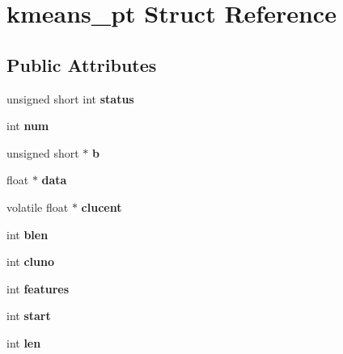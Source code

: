 \hypertarget{structkmeans__pt}{}\section{kmeans\+\_\+pt Struct Reference}
\label{structkmeans__pt}
\subsection*{Public Attributes}
\begin{DoxyCompactItemize}
\item 
\mbox{\label{structkmeans__pt_adc9152bce7b95fd51d6185901169c52b}} 
unsigned short int {\bfseries status}
\item 
\mbox{\label{structkmeans__pt_a72c17b986e5cc7bbdcc92d59ef05e8f0}} 
int {\bfseries num}
\item 
\mbox{\label{structkmeans__pt_a00950024e02b55ade4be01f829f7f11d}} 
unsigned short $\ast$ {\bfseries b}
\item 
\mbox{\label{structkmeans__pt_a6efb6f48fc6294152d77552f183704da}} 
float $\ast$ {\bfseries data}
\item 
\mbox{\label{structkmeans__pt_aca0bb922070f8b7dd1f0e82a4b8ca607}} 
volatile float $\ast$ {\bfseries clucent}
\item 
\mbox{\label{structkmeans__pt_a4346d32e38a81feaf2799f25abf84a16}} 
int {\bfseries blen}
\item 
\mbox{\label{structkmeans__pt_a987049eea35a32b1d1ba469f37b4a862}} 
int {\bfseries cluno}
\item 
\mbox{\label{structkmeans__pt_a0b7e9c2f96d55642a579c66c916dfbac}} 
int {\bfseries features}
\item 
\mbox{\label{structkmeans__pt_a7568dca47a635b63a775853ace1a231f}} 
int {\bfseries start}
\item 
\mbox{\label{structkmeans__pt_af49609aa1989feab464cfc85a25c3ec4}} 
int {\bfseries len}

\end{DoxyCompactItemize}
